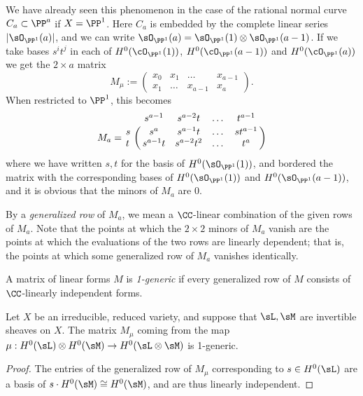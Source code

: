 \begin{example}
 We have already seen this phenomenon in the case of the rational normal curve $C_a\subset \PP^a$ if $X = \PP^1$.
Here $C_{a}$ is embedded by the complete
linear series $|\sO_{\PP^1}(a)|$, and  we can write $\sO_{\PP^1}(a) = \sO_{\PP^1}(1)\otimes \sO_{\PP^1}(a-1)$.
If we take bases $s^it^j$ in each of $H^0(\cO_{\PP^1}(1))$,  $H^0(\cO_{\PP^1}(a-1))$ and $H^0(\cO_{\PP^1}(a))$ 
we get
the $2\times a$ matrix
$$
M_\mu := 
\begin{pmatrix}
x_0&x_1&\dots&x_{a-1}\\
x_1&\dots&x_{a-1}&x_a
\end{pmatrix}.
$$
When restricted to $\PP^1$, this becomes
$$
M_a = \bordermatrix{
& s^{a-1}&s^{a-2}t&\dots&t^{a-1}\cr
s&  s^{a}& s^{a-1}t&\dots&st^{a-1}\cr
t&  s^{a-1}t& s^{a-2}t^{2}&\dots&t^{a}\cr
}$$
where we have written $s,t$ for the basis of $H^0(\sO_{\PP^1}(1))$, and bordered the matrix
with the corresponding bases of $H^0(\sO_{\PP^1}(1))$ and $H^0(\sO_{\PP^1}(a-1))$, and it is obvious
that the minors of $M_a$ are 0.
\end{example}

By a \emph{generalized row} of $M_{a}$, we mean a $\CC$-linear combination of the given rows of $M_{a}$. Note that the points at which the $2\times 2$ minors of $M_{a}$ vanish are the points at which the evaluations of the two rows are linearly dependent; that is, the points at which some
generalized row of $M_{a}$ vanishes identically. 

\begin{definition}
 A matrix of linear forms $M$ is  \emph{1-generic} if every generalized row of $M$
 consists of $\CC$-linearly independent forms.
 \end{definition}
 
 \begin{proposition}\label{some generators}\label{some equations}
Let $X$ be
an irreducible, reduced variety, and suppose that $\sL,\sM$ are invertible sheaves on $X$.
The matrix $M_\mu$ coming from the map $\mu:H^0(\sL) \otimes H^0(\sM) \to H^0(\sL\otimes \sM)$
is 1-generic.
\end{proposition}

\begin{proof} The entries of the generalized row of $M_\mu$ corresponding to $s\in H^0(\sL)$
are a basis of $s\cdot H^0(\sM) \cong H^0(\sM)$, and are thus
linearly independent.
\end{proof}

